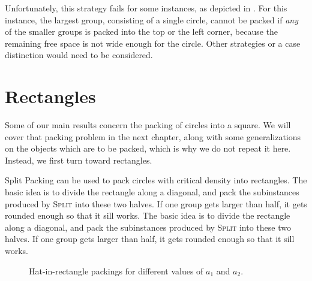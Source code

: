 \documentclass[a4paper,style=print,bibliography=totoc,nexus,lnum,extramargin]{tubsbook}
\begin{document}
Unfortunately, this strategy fails for some instances, as depicted in . For this instance, the largest group, consisting of a single circle, cannot be packed if \emph{any} of the smaller groups is packed into the top or the left corner, because the remaining free space is not wide enough for the circle. Other strategies or a case distinction would need to be considered.


\section{Rectangles}\label{sec:rectangles}

Some of our main results concern the packing of circles into a square. We will cover that packing problem in the next chapter, along with some generalizations on the objects which are to be packed, which is why we do not repeat it here. Instead, we first turn toward rectangles.

Split Packing can be used to pack circles with critical density into rectangles. The basic idea is to divide the rectangle along a diagonal, and pack the subinstances produced by \textsc{Split} into these two halves. If one group gets larger than half, it gets rounded enough so that it sill works. The basic idea is to divide the rectangle along a diagonal, and pack the subinstances produced by \textsc{Split} into these two halves. If one group gets larger than half, it gets rounded enough so that it sill works.

\begin{figure}

    \vspace{5mm}


    \caption{Hat-in-rectangle packings for different values of $a_1$ and $a_2$.}
    \label{fig:hats-in-rect}
\end{figure}
\end{document}
